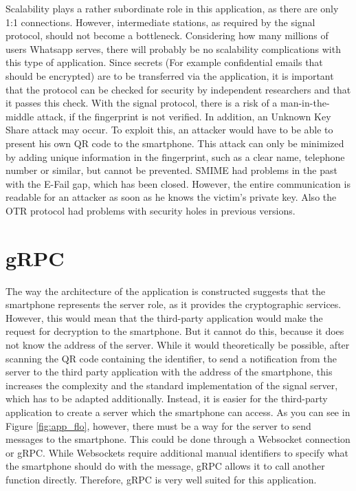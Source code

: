 \documentclass[12pt,oneside,a4paper,parskip]{scrbook}
\begin{document}
Scalability plays a rather subordinate role in this application, as there are only 1:1 connections. However, intermediate stations, as required by the signal protocol, should not become a bottleneck. Considering how many millions of users Whatsapp serves, there will probably be no scalability complications with this type of application.\newline
Since secrets (For example confidential emails that should be encrypted) are to be transferred via the application, it is important that the protocol can be checked for security by independent researchers and that it passes this check.
With the signal protocol, there is a risk of a man-in-the-middle attack, if the fingerprint is not verified. In addition, an Unknown Key Share attack may occur. To exploit this, an attacker would have to be able to present his own QR code to the smartphone. This attack can only be minimized by adding unique information in the fingerprint, such as a clear name, telephone number or similar, but cannot be prevented. \parencite{marlinspike_x3dh_2016} \newline
SMIME had problems in the past with the E-Fail gap, which has been closed. However, the entire communication is readable for an attacker as soon as he knows the victim's private key. \parencite{bsi_bsi_nodate} \newline
Also the OTR protocol had problems with security holes in previous versions. \parencite{bonneau_finite-state_nodate}

\section{gRPC}
The way the architecture of the application is constructed suggests that the smartphone represents the server role, as it provides the cryptographic services. However, this would mean that the third-party application would make the request for decryption to the smartphone. But it cannot do this, because it does not know the address of the server. While it would theoretically be possible, after scanning the QR code containing the identifier, to send a notification from the server to the third party application with the address of the smartphone, this increases the complexity and the standard implementation of the signal server, which has to be adapted additionally. Instead, it is easier for the third-party application to create a server which the smartphone can access. As you can see in Figure \ref{fig:app_flo}, however, there must be a way for the server to send messages to the smartphone. This could be done through a Websocket connection or gRPC. While Websockets require additional manual identifiers to specify what the smartphone should do with the message, gRPC allows it to call another function directly. Therefore, gRPC is very well suited for this application.
\end{document}

